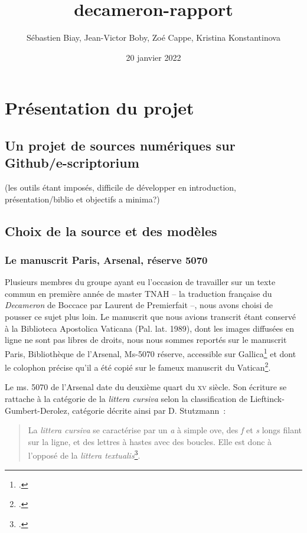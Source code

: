 \documentclass{article}
\title{decameron-rapport}
\author{Sébastien Biay, Jean-Victor Boby, Zoé Cappe, Kristina Konstantinova}
\date{20 janvier 2022}
\newcommand{\siecle}[1]{\textsc{#1}\ieme}
\begin{document}
	
	\maketitle
	
	\section{Présentation du projet}
	\subsection{Un projet de sources numériques sur Github/e-scriptorium}
	(les outils étant imposés, difficile de développer en introduction, présentation/biblio et objectifs a minima?)
	
	\subsection{Choix de la source et des modèles}
	
	\subsubsection{Le manuscrit Paris, Arsenal, réserve 5070}
	Plusieurs membres du groupe ayant eu l'occasion de travailler sur un texte commun en première année de master TNAH – la traduction française du \textit{Decameron} de Boccace par Laurent de Premierfait –, nous avons choisi de pousser ce sujet plus loin.
	Le manuscrit que nous avions transcrit étant conservé à la Biblioteca Apostolica Vaticana (Pal. lat. 1989), dont les images diffusées en ligne ne sont pas libres de droits, nous nous sommes reportés sur le manuscrit Paris, Bibliothèque de l'Arsenal, Ms-5070 réserve, accessible sur Gallica\footcite{gallicaParisBibliothequeArsenal, bnfarchivesetmanuscritsMs5070BoccaceDecameron2022} et dont le colophon précise qu'il a été copié sur le fameux manuscrit du Vatican\footcite{irhtsectionromaneNoticeParisBibliotheque2012}.
	
	Le ms. 5070 de l'Arsenal date du deuxième quart du \siecle{xv} siècle. Son écriture se rattache à la catégorie de la \textit{littera cursiva} selon la classification de Lieftinck-Gumbert-Derolez, catégorie décrite ainsi par D. Stutzmann~:
	\begin{quotation}La \textit{littera cursiva} se caractérise par un \textit{a} à simple ove, des \textit{f} et \textit{s} longs filant sur la ligne, et des lettres à hastes avec des boucles. Elle est donc à l’opposé de la \textit{littera textualis}\footcite{stutzmannEcrituresGothiquesLivresques2022}.\end{quotation}
	
\end{document}
